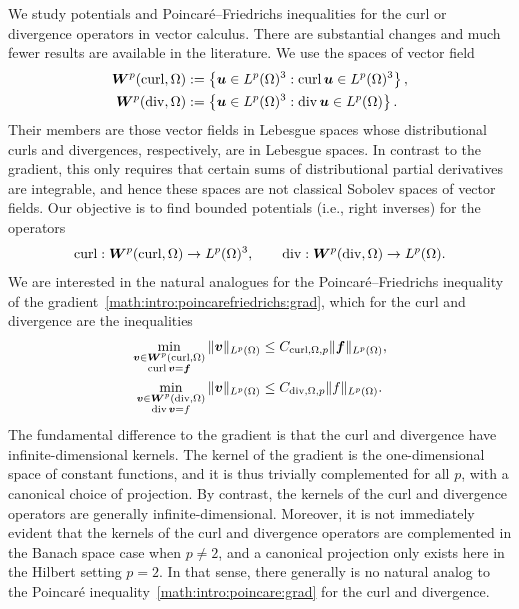 \documentclass[10pt,a4paper]{article}
\begin{document}
We study potentials and Poincar\'e--Friedrichs inequalities for the curl or divergence operators in vector calculus.
There are substantial changes and much fewer results are available in the literature. 
We use the spaces of vector field 
\begin{align}
    \bm{W}^{p}(\operatorname{curl},\Omega) &:= \left\{ \bm{u} \in L^{p}(\Omega)^{3} : \operatorname{curl} \bm{u} \in L^{p}(\Omega)^{3} \right\}
    \label{math:intro:Wcurl}
    ,
    \\
    \bm{W}^{p}(\operatorname{div},\Omega) &:= \left\{ \bm{u} \in L^{p}(\Omega)^{3} : \operatorname{div} \bm{u} \in L^{p}(\Omega) \right\}
    \label{math:intro:Wdiv}
    .
\end{align}
Their members are those vector fields in Lebesgue spaces whose distributional curls and divergences, respectively, are in Lebesgue spaces. 
In contrast to the gradient, this only requires that certain sums of distributional partial derivatives are integrable, 
and hence these spaces are not classical Sobolev spaces of vector fields. 
Our objective is to find bounded potentials (i.e., right inverses) for the operators 
\begin{align*}
    \operatorname{curl} : \bm{W}^{p}(\operatorname{curl},\Omega) \rightarrow L^{p}(\Omega)^{3},
    \qquad 
    \operatorname{div} : \bm{W}^{p}(\operatorname{div},\Omega) \rightarrow L^{p}(\Omega).
\end{align*}
We are interested in the natural analogues for the Poincar\'e--Friedrichs inequality of the gradient~\eqref{math:intro:poincarefriedrichs:grad},
which for the curl and divergence are the inequalities 
\begin{align}
    \min\limits_{ \substack{ \bfv \in \bfW^{p}(\curl,\Omega) \\ \curl \bfv = \bff } } 
    \| \bfv \|_{L^{p}(\Omega)}
    &\leq 
    C_{\curl,\Omega,p}
    \| \bff \|_{L^{p}(\Omega)}
    \label{math:intro:Wcurl:pf}
    ,
    \\%
    \min\limits_{ \substack{ \bfv \in \bfW^{p}(\divergence,\Omega) \\ \divergence \bfv = f } } 
    \| \bfv \|_{L^{p}(\Omega)}
    &\leq 
    C_{\divergence,\Omega,p}
    \| f \|_{L^{p}(\Omega)}
    \label{math:intro:Wdiv:pf}
    .
\end{align}
The fundamental difference to the gradient is that the curl and divergence have infinite-dimensional kernels.
The kernel of the gradient is the one-dimensional space of constant functions, and it is thus trivially complemented for all $p$, with a canonical choice of projection.
By contrast, the kernels of the curl and divergence operators are generally infinite-dimensional.
Moreover, it is not immediately evident that the kernels of the curl and divergence operators are complemented in the Banach space case when $p \neq 2$,
and a canonical projection only exists here in the Hilbert setting $p=2$.
In that sense, there generally is no natural analog to the Poincar\'e inequality~\eqref{math:intro:poincare:grad} for the curl and divergence.
\end{document}
